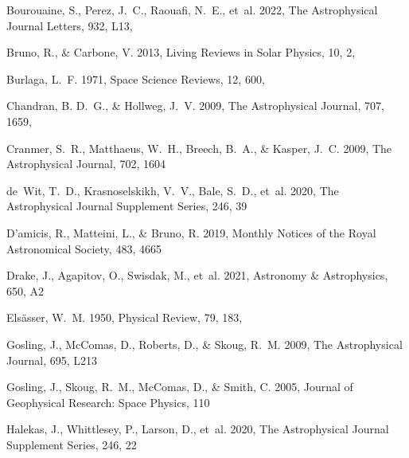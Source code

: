 \documentclass[twocolumn, times]{aastex631}
\begin{document}
\begin{thebibliography}{}
Bourouaine, S., Perez, J.~C., Raouafi, N.~E., {et~al.} 2022, The Astrophysical Journal Letters, 932, L13, 

Bruno, R., \& Carbone, V. 2013, Living Reviews in Solar Physics, 10, 2, 

Burlaga, L.~F. 1971, Space Science Reviews, 12, 600, 

Chandran, B. D.~G., \& Hollweg, J.~V. 2009, The Astrophysical Journal, 707, 1659, 

Cranmer, S.~R., Matthaeus, W.~H., Breech, B.~A., \& Kasper, J.~C. 2009, The Astrophysical Journal, 702, 1604

de~Wit, T.~D., Krasnoselskikh, V.~V., Bale, S.~D., {et~al.} 2020, The Astrophysical Journal Supplement Series, 246, 39

D’amicis, R., Matteini, L., \& Bruno, R. 2019, Monthly Notices of the Royal Astronomical Society, 483, 4665

Drake, J., Agapitov, O., Swisdak, M., {et~al.} 2021, Astronomy \& Astrophysics, 650, A2

Els\"asser, W.~M. 1950, Physical Review, 79, 183, 

Gosling, J., McComas, D., Roberts, D., \& Skoug, R.~M. 2009, The Astrophysical Journal, 695, L213

Gosling, J., Skoug, R.~M., McComas, D., \& Smith, C. 2005, Journal of Geophysical Research: Space Physics, 110

Halekas, J., Whittlesey, P., Larson, D., {et~al.} 2020, The Astrophysical Journal Supplement Series, 246, 22


\end{thebibliography}
\end{document}
